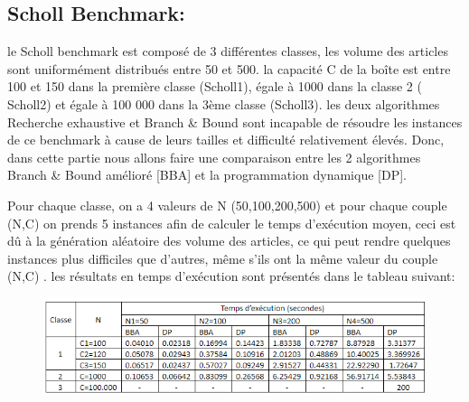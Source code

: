 \documentclass[12pt]{article}
\begin{document}
\subsection{Scholl Benchmark:}
le Scholl benchmark est composé de 3 différentes classes, les volume des articles sont uniformément distribués entre 50 et 500. la capacité C de la boîte est entre 100 et 150 dans la première classe (Scholl1), égale à 1000 dans la classe 2 ( Scholl2) et égale à 100 000 dans la 3ème classe (Scholl3). 
les deux algorithmes Recherche exhaustive et Branch \& Bound sont incapable de résoudre les instances de ce benchmark à cause de leurs tailles et difficulté relativement élevés. Donc, dans cette partie nous allons faire une comparaison entre les 2 algorithmes Branch \& Bound amélioré [BBA] et la programmation dynamique [DP]. 

Pour chaque classe, on a 4 valeurs de N (50,100,200,500) et pour chaque couple (N,C) on prends 5 instances afin de calculer le temps d'exécution moyen, ceci est dû à la génération aléatoire des volume des articles, ce qui peut rendre quelques instances plus difficiles que d’autres, même s’ils ont la même valeur du couple (N,C) . les résultats en temps d'exécution sont présentés dans le tableau suivant:
\begin{figure}[H]
    \includegraphics[width=13.5cm]{../figures/tab2.png}
\end{figure}
\end{document}
